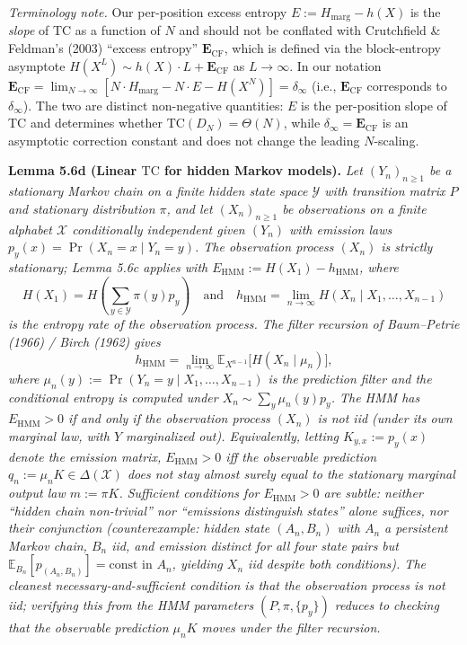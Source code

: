 \documentclass[
]{article}
\begin{document}
\emph{Terminology note.} Our per-position excess entropy
$E := H_{\mathrm{marg}} - h(X)$ is the \emph{slope} of TC as a
function of $N$ and should not be conflated with Crutchfield \&
Feldman's (2003) ``excess entropy'' $\mathbf{E}_{\mathrm{CF}}$,
which is defined via the block-entropy asymptote
$H(X^L) \sim h(X) \cdot L + \mathbf{E}_{\mathrm{CF}}$ as $L \to \infty$.
In our notation $\mathbf{E}_{\mathrm{CF}} = \lim_{N \to \infty}
[N \cdot H_{\mathrm{marg}} - N \cdot E - H(X^N)] = \delta_\infty$
(i.e., $\mathbf{E}_{\mathrm{CF}}$ corresponds to $\delta_\infty$).
The two are distinct non-negative quantities: $E$ is the per-position
slope of TC and determines whether $\mathrm{TC}(D_N) = \Theta(N)$,
while $\delta_\infty = \mathbf{E}_{\mathrm{CF}}$ is an asymptotic
correction constant and does not change the leading $N$-scaling.

\textbf{Lemma 5.6d (Linear $\mathrm{TC}$ for hidden Markov models).}
\emph{Let $(Y_n)_{n \geq 1}$ be a stationary Markov chain on a
finite hidden state space $\mathcal{Y}$ with transition matrix $P$
and stationary distribution $\pi$, and let $(X_n)_{n \geq 1}$ be
observations on a finite alphabet $\mathcal{X}$ conditionally
independent given $(Y_n)$ with emission laws
$p_y(x) = \Pr(X_n = x \mid Y_n = y)$. The observation process
$(X_n)$ is strictly stationary; Lemma 5.6c applies with
$E_{\mathrm{HMM}} := H(X_1) - h_{\mathrm{HMM}}$, where}
\[
H(X_1) = H\!\left(\sum_{y \in \mathcal{Y}} \pi(y) p_y\right)
\quad\text{and}\quad
h_{\mathrm{HMM}} = \lim_{n \to \infty} H(X_n \mid X_1, \ldots, X_{n-1})
\]
\emph{is the entropy rate of the observation process. The
filter recursion of Baum--Petrie (1966) /
Birch (1962) gives}
\[
h_{\mathrm{HMM}} = \lim_{n \to \infty} \mathbb{E}_{X^{n-1}}
\bigl[H(X_n \mid \mu_n)\bigr],
\]
\emph{where $\mu_n(y) := \Pr(Y_n = y \mid X_1, \ldots, X_{n-1})$ is
the prediction filter and the conditional entropy is computed
under $X_n \sim \sum_y \mu_n(y) p_y$. The HMM has
$E_{\mathrm{HMM}} > 0$ if and only if the observation process
$(X_n)$ is not iid (under its own marginal law, with $Y$ marginalized
out). Equivalently, letting $K_{y,x} := p_y(x)$ denote the emission
matrix, $E_{\mathrm{HMM}} > 0$ iff the observable prediction
$q_n := \mu_n K \in \Delta(\mathcal{X})$ does not stay almost surely
equal to the stationary marginal output law $m := \pi K$. Sufficient
conditions for $E_{\mathrm{HMM}} > 0$ are subtle: neither
``hidden chain non-trivial'' nor ``emissions distinguish states''
alone suffices, nor their conjunction (counterexample: hidden state
$(A_n, B_n)$ with $A_n$ a persistent Markov chain, $B_n$ iid, and
emission distinct for all four state pairs but
$\mathbb{E}_{B_n}[p_{(A_n, B_n)}] = \text{const in } A_n$, yielding
$X_n$ iid despite both conditions). The cleanest necessary-and-sufficient
condition is that the observation process is not iid; verifying this
from the HMM parameters $(P, \pi, \{p_y\})$ reduces to checking
that the observable prediction $\mu_n K$ moves under the
filter recursion.}
\end{document}
